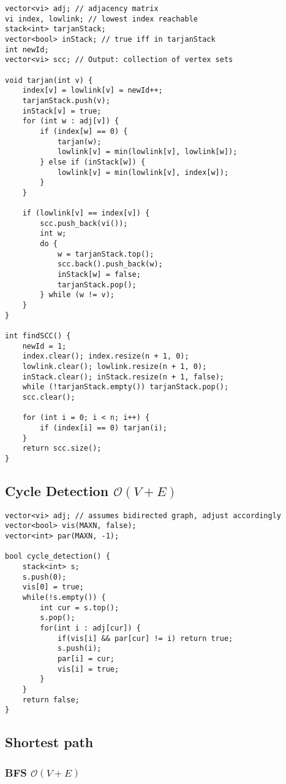 \documentclass{article}
\begin{document}
\begin{lstlisting}
vector<vi> adj; // adjacency matrix
vi index, lowlink; // lowest index reachable
stack<int> tarjanStack;
vector<bool> inStack; // true iff in tarjanStack
int newId;
vector<vi> scc; // Output: collection of vertex sets

void tarjan(int v) {
	index[v] = lowlink[v] = newId++;
	tarjanStack.push(v);
	inStack[v] = true;
	for (int w : adj[v]) {
		if (index[w] == 0) {
			tarjan(w);
			lowlink[v] = min(lowlink[v], lowlink[w]);
		} else if (inStack[w]) {
			lowlink[v] = min(lowlink[v], index[w]);
		}
	}
	
	if (lowlink[v] == index[v]) {
		scc.push_back(vi());
		int w;
		do {
			w = tarjanStack.top();
			scc.back().push_back(w);
			inStack[w] = false;
			tarjanStack.pop();
		} while (w != v);
	}
}

int findSCC() {
	newId = 1;
	index.clear(); index.resize(n + 1, 0);
	lowlink.clear(); lowlink.resize(n + 1, 0);
	inStack.clear(); inStack.resize(n + 1, false);
	while (!tarjanStack.empty()) tarjanStack.pop();
	scc.clear();

	for (int i = 0; i < n; i++) {
		if (index[i] == 0) tarjan(i);
	}
	return scc.size();
}

\end{lstlisting}

\subsection{Cycle Detection $\mathcal{O}(V + E)$}

\begin{lstlisting}
vector<vi> adj; // assumes bidirected graph, adjust accordingly
vector<bool> vis(MAXN, false);
vector<int> par(MAXN, -1);

bool cycle_detection() {
	stack<int> s;
	s.push(0);
	vis[0] = true;
	while(!s.empty()) {
		int cur = s.top();
		s.pop();
		for(int i : adj[cur]) {
			if(vis[i] && par[cur] != i) return true;
			s.push(i);
			par[i] = cur;
			vis[i] = true;
		}
	}
	return false;
} 

\end{lstlisting}

\subsection{Shortest path}
\subsubsection{BFS $\mathcal{O}(V + E)$}
\end{document}

